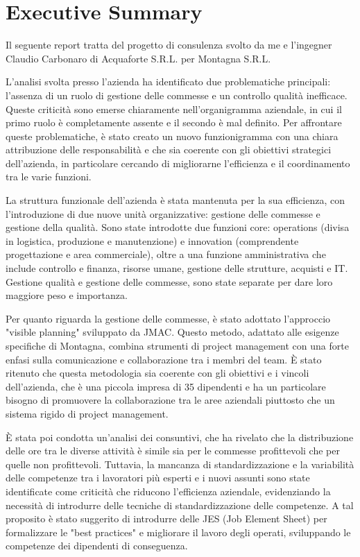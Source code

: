 \chapter{Executive Summary}

\begin{multicols}{2}
  Il seguente report tratta del progetto di consulenza svolto da me e l'ingegner Claudio Carbonaro di Acquaforte S.R.L. per Montagna S.R.L.

	L'analisi svolta presso l'azienda ha identificato due problematiche principali: l'assenza di un ruolo di gestione delle commesse e un controllo qualità inefficace. Queste criticità sono emerse chiaramente nell'organigramma aziendale, in cui il primo ruolo è completamente assente e il secondo è mal definito. Per affrontare queste problematiche, è stato creato un nuovo funzionigramma con una chiara attribuzione delle responsabilità e che sia coerente con gli obiettivi strategici dell'azienda, in particolare cercando di migliorarne l'efficienza e il coordinamento tra le varie funzioni.

	La struttura funzionale dell'azienda è stata mantenuta per la sua efficienza, con l'introduzione di due nuove unità organizzative: gestione delle commesse e gestione della qualità.
  Sono state introdotte due funzioni core: operations (divisa in logistica, produzione e manutenzione) e innovation (comprendente progettazione e area commerciale), oltre a una funzione amministrativa che include controllo e finanza, risorse umane, gestione delle strutture, acquisti e IT. Gestione qualità e gestione delle commesse, sono state separate per dare loro maggiore peso e importanza.

	Per quanto riguarda la gestione delle commesse, è stato adottato l'approccio "visible planning" sviluppato da JMAC. Questo metodo, adattato alle esigenze specifiche di Montagna, combina strumenti di project management con una forte enfasi sulla comunicazione e collaborazione tra i membri del team. È stato ritenuto che questa metodologia sia coerente con gli obiettivi e i vincoli dell'azienda, che è una piccola impresa di 35 dipendenti e ha un particolare bisogno di promuovere la collaborazione tra le aree aziendali piuttosto che un sistema rigido di project management.

	È stata poi condotta un'analisi dei consuntivi, che ha rivelato che la distribuzione delle ore tra le diverse attività è simile sia per le commesse profittevoli che per quelle non profittevoli. Tuttavia, la mancanza di standardizzazione e la variabilità delle competenze tra i lavoratori più esperti e i nuovi assunti sono state identificate come criticità che riducono l'efficienza aziendale, evidenziando la necessità di introdurre delle tecniche di standardizzazione delle competenze. A tal proposito è stato suggerito di introdurre delle JES (Job Element Sheet) per formalizzare le "best practices" e migliorare il lavoro degli operati, sviluppando le competenze dei dipendenti di conseguenza.


\end{multicols}
